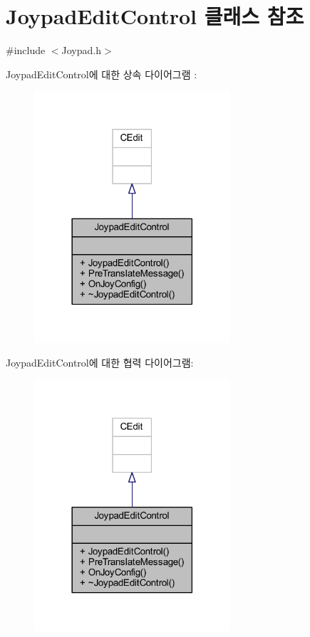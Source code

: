 \hypertarget{class_joypad_edit_control}{}\section{Joypad\+Edit\+Control 클래스 참조}
\label{class_joypad_edit_control}


{\ttfamily \#include $<$Joypad.\+h$>$}



Joypad\+Edit\+Control에 대한 상속 다이어그램 \+: \nopagebreak
\begin{figure}[H]
\begin{center}
\leavevmode
\includegraphics[width=206pt]{class_joypad_edit_control__inherit__graph}
\end{center}
\end{figure}


Joypad\+Edit\+Control에 대한 협력 다이어그램\+:\nopagebreak
\begin{figure}[H]
\begin{center}
\leavevmode
\includegraphics[width=206pt]{class_joypad_edit_control__coll__graph}
\end{center}
\end{figure}
